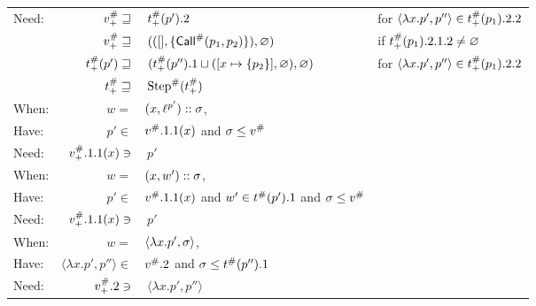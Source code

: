 \begin{center}
\begin{tabular}{|l@{\hskip2pt}r@{\hskip2pt}l@{\hskip2pt}l|}
    Need: & ${v}^{\#}_+\sqsupseteq$              & $\:{t}^{\#}_+(p').2$                                                     & for $\langle\lambda x.p',p''\rangle\in{t}^{\#}_+(p_1).2.2$ \\
          & ${v}^{\#}_+\sqsupseteq$              & $\:(([],\{{\textsf{Call}}^{\#}(p_1,p_2)\}),\varnothing)$                             & if ${t}^{\#}_+(p_1).2.1.2\neq\varnothing$                  \\
          & ${t}^{\#}_+(p')\sqsupseteq$       & $\:({t}^{\#}_+(p'').1\sqcup([x\mapsto\{p_2\}],\varnothing),\varnothing)$ & for $\langle\lambda x.p',p''\rangle\in{t}^{\#}_+(p_1).2.2$ \\
          & ${t}^{\#}_+\sqsupseteq$           & $\:{\text{Step}}^{\#}({t}^{\#}_+)$                                                &                                                              \\
    \hline
    When: & $w=$                                & $(x,{\ell}^{p'})::\sigma$,                                          &                                                              \\
    Have: & $p'\in$                             & ${v}^{\#}.1.1(x)$ and $\sigma\le{v}^{\#}$                                      &                                                              \\
    Need: & ${v}^{\#}_+.1.1(x)\ni$               & $\:p'$                                                                     &                                                              \\
    \hline
    When: & $w=$                                & $(x,w')::\sigma$,                                                         &                                                              \\
    Have: & $p'\in$                             & ${v}^{\#}.1.1(x)$ and $w'\in{t}^{\#}(p').1$ and $\sigma\le{v}^{\#}$          &                                                              \\
    Need: & ${v}^{\#}_+.1.1(x)\ni$               & $\:p'$                                                                     &                                                              \\
    \hline
    When: & $w=$                                & $\langle\lambda x.p',\sigma\rangle$,                                         &                                                              \\
    Have: & $\langle\lambda x.p',p''\rangle\in$ & ${v}^{\#}.2$ and $\sigma\le{t}^{\#}(p'').1$                                 &                                                              \\
    Need: & ${v}^{\#}_+.2\ni$                    & $\:\langle\lambda x.p',p''\rangle$                                         &                                                              \\
    \hline
  \end{tabular}
\end{center}
